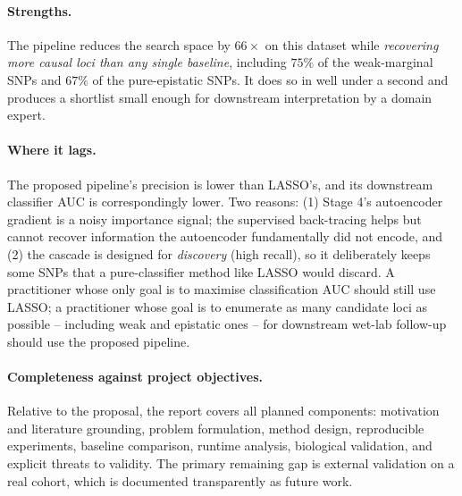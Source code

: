 \documentclass[11pt,a4paper]{article}
\begin{document}
\paragraph{Strengths.} The pipeline reduces the search space by $66\times$
on this dataset while \emph{recovering more causal loci than any single
baseline}, including $75\%$ of the weak-marginal SNPs and $67\%$ of the
pure-epistatic SNPs. It does so in well under a second and produces a
shortlist small enough for downstream interpretation by a domain expert.

\paragraph{Where it lags.} The proposed pipeline's precision is lower
than LASSO's, and its downstream classifier AUC is correspondingly lower.
Two reasons: (1) Stage 4's autoencoder gradient is a noisy importance
signal; the supervised back-tracing helps but cannot recover information
the autoencoder fundamentally did not encode, and (2) the cascade is
designed for \emph{discovery} (high recall), so it deliberately keeps
some SNPs that a pure-classifier method like LASSO would discard. A
practitioner whose only goal is to maximise classification AUC should
still use LASSO; a practitioner whose goal is to enumerate as many
candidate loci as possible -- including weak and epistatic ones -- for
downstream wet-lab follow-up should use the proposed pipeline.

\paragraph{Completeness against project objectives.} Relative to the proposal,
the report covers all planned components: motivation and literature grounding,
problem formulation, method design, reproducible experiments, baseline
comparison, runtime analysis, biological validation, and explicit threats to
validity. The primary remaining gap is external validation on a real cohort,
which is documented transparently as future work.
\end{document}
